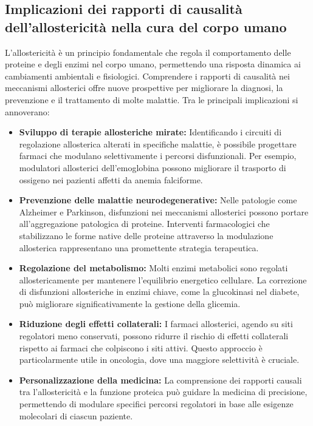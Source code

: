 \documentclass[Lau,binding=0.6cm,oneside,noexaminfo]{sapthesis}
\begin{document}
\subsection*{Implicazioni dei rapporti di causalità dell'allostericità nella cura del corpo umano}

L'allostericità è un principio fondamentale che regola il comportamento delle proteine e degli enzimi nel corpo umano, permettendo una risposta dinamica ai cambiamenti ambientali e fisiologici. Comprendere i rapporti di causalità nei meccanismi allosterici offre nuove prospettive per migliorare la diagnosi, la prevenzione e il trattamento di molte malattie. Tra le principali implicazioni si annoverano:

\begin{itemize}
    \item \textbf{Sviluppo di terapie allosteriche mirate:} Identificando i circuiti di regolazione allosterica alterati in specifiche malattie, è possibile progettare farmaci che modulano selettivamente i percorsi disfunzionali. Per esempio, modulatori allosterici dell'emoglobina possono migliorare il trasporto di ossigeno nei pazienti affetti da anemia falciforme.
    
    \item \textbf{Prevenzione delle malattie neurodegenerative:} Nelle patologie come Alzheimer e Parkinson, disfunzioni nei meccanismi allosterici possono portare all'aggregazione patologica di proteine. Interventi farmacologici che stabilizzano le forme native delle proteine attraverso la modulazione allosterica rappresentano una promettente strategia terapeutica.
    
    \item \textbf{Regolazione del metabolismo:} Molti enzimi metabolici sono regolati allostericamente per mantenere l'equilibrio energetico cellulare. La correzione di disfunzioni allosteriche in enzimi chiave, come la glucokinasi nel diabete, può migliorare significativamente la gestione della glicemia.
    
    \item \textbf{Riduzione degli effetti collaterali:} I farmaci allosterici, agendo su siti regolatori meno conservati, possono ridurre il rischio di effetti collaterali rispetto ai farmaci che colpiscono i siti attivi. Questo approccio è particolarmente utile in oncologia, dove una maggiore selettività è cruciale.
    
    \item \textbf{Personalizzazione della medicina:} La comprensione dei rapporti causali tra l'allostericità e la funzione proteica può guidare la medicina di precisione, permettendo di modulare specifici percorsi regolatori in base alle esigenze molecolari di ciascun paziente.
\end{itemize}
\end{document}
